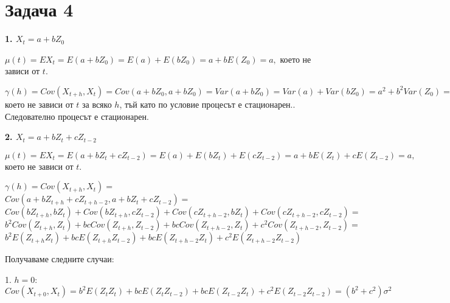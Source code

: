 \documentclass{article}
\begin{document}
\section*{Задача 4}
\begin{flushleft}

\textbf{1. $X_t = a + bZ_0$}
\begin{flushleft}
$\mu(t) = EX_t = E(a + bZ_0) = E(a) + E(bZ_0) = a + bE(Z_0) = a,$ което не зависи от $t$. \\

\begin{flushleft}
$\gamma(h) = Cov(X_{t+h}, X_t) = Cov(a + bZ_0, a + bZ_0) = Var(a + bZ_0) = Var(a) + Var(bZ_0) = a^2 + b^2Var(Z_0) = a^2 + b^2 \sigma^2,$ което не зависи от $t$ за всяко $h$, тъй като по условие процесът е стационарен.. Следователно процесът е стационарен. 
\end{flushleft}

\end{flushleft}

\textbf{2. $X_t = a + bZ_t + cZ_{t-2}$}
\begin{flushleft}

\begin{flushleft}
$\mu(t) = EX_t = E(a + bZ_t + cZ_{t-2}) = E(a) + E(bZ_t) + E(cZ_{t-2}) = a + bE(Z_t) + cE(Z_{t-2}) = a,$ което не зависи от $t$. \\
\end{flushleft}

\begin{flushleft}
$\gamma(h) = Cov(X_{t+h}, X_t) = $ \\ 
$Cov(a + bZ_{t+h} + cZ_{t+h-2}, a + bZ_t + cZ_{t-2}) = $ \\
$Cov(bZ_{t+h}, bZ_{t}) +Cov(bZ_{t+h}, cZ_{t-2}) + Cov(cZ_{t+h-2}, bZ_t) + Cov(cZ_{t+h-2}, cZ_{t-2}) =$ \\ 
$b^2Cov(Z_{t+h}, Z_t) + bcCov(Z_{t+h}, Z_{t-2}) + bcCov(Z_{t+h-2}, Z_t) + c^2Cov(Z_{t+h-2}, Z_{t-2}) =$ \\
$b^2E(Z_{t+h}Z_t) + bcE(Z_{t+h}Z_{t-2}) + bcE(Z_{t+h-2}Z_t) + c^2E(Z_{t+h-2}Z_{t-2})$ \\
\end{flushleft}

Получаваме следните случаи: \\
\begin{flushleft}
1. $h = 0$: \\
$Cov(X_{t+0}, X_t) = b^2E(Z_{t}Z_t) + bcE(Z_{t}Z_{t-2}) + bcE(Z_{t-2}Z_t) + c^2E(Z_{t-2}Z_{t-2}) = (b^2 + c^2)\sigma^2$
\end{flushleft}


\end{flushleft}
\end{flushleft}
\end{document}
